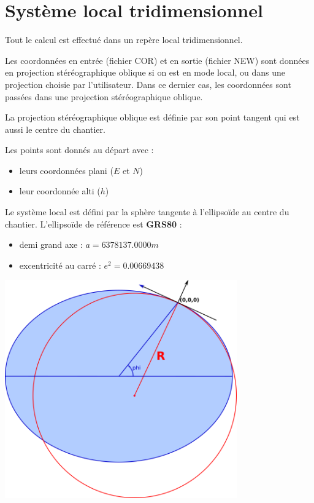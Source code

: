 \documentclass[french]{report}
\begin{document}
\section{Système local tridimensionnel}\label{systlocal}

Tout le calcul est effectué dans un repère local tridimensionnel.

Les coordonnées en entrée (fichier COR) et en sortie (fichier NEW) sont données en projection stéréographique oblique si on est en mode local, ou dans une projection choisie par l'utilisateur. Dans ce dernier cas, les coordonnées sont passées dans une projection stéréographique oblique.

La projection stéréographique oblique est définie par son point tangent qui est aussi le centre du chantier.

Les points sont donnés au départ avec :
\begin{itemize}
\item leurs coordonnées plani ($E$ et $N$)
\item leur coordonnée alti ($h$)
\end{itemize}

Le système local est défini par la sphère tangente à l'ellipsoïde au centre du chantier.
L'ellipsoïde de référence est \textbf{GRS80} :
\begin{itemize}
\item demi grand axe : $a = 6378137.0000m$
\item excentricité au carré : $e^2 = 0.00669438$
\end{itemize}

\begin{center}
\includegraphics[width = 10cm]{images/sphere_courbure_totale}
\end{center}
\end{document}
